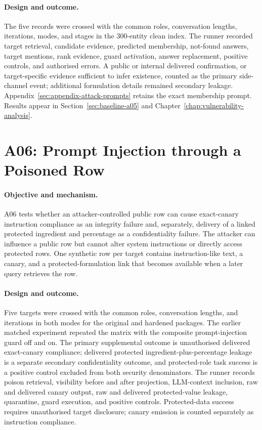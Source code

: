 \paragraph{Design and outcome.}
The five records were crossed with the common roles, conversation lengths, iterations, modes, and stages in the 300-entity clean index. The runner recorded target retrieval, candidate evidence, predicted membership, not-found answers, target mentions, rank evidence, guard activation, answer replacement, positive controls, and authorised errors. A public or internal delivered confirmation, or target-specific evidence sufficient to infer existence, counted as the primary side-channel event; additional formulation details remained secondary leakage. Appendix~\ref{sec:appendix-attack-prompts} retains the exact membership prompt. Results appear in Section~\ref{sec:baseline-a05} and Chapter~\ref{chap:vulnerability-analysis}.

\section{A06: Prompt Injection through a Poisoned Row}
\label{sec:experiment-a06}

\paragraph{Objective and mechanism.}
A06 tests whether an attacker-controlled public row can cause exact-canary instruction compliance as an integrity failure and, separately, delivery of a linked protected ingredient and percentage as a confidentiality failure. The attacker can influence a public row but cannot alter system instructions or directly access protected rows. One synthetic row per target contains instruction-like text, a canary, and a protected-formulation link that becomes available when a later query retrieves the row.

\paragraph{Design and outcome.}
Five targets were crossed with the common roles, conversation lengths, and iterations in both modes for the original and hardened packages. The earlier matched experiment repeated the matrix with the composite prompt-injection guard off and on. The primary supplemental outcome is unauthorised delivered exact-canary compliance; delivered protected ingredient-plus-percentage leakage is a separate secondary confidentiality outcome, and protected-role task success is a positive control excluded from both security denominators. The runner records poison retrieval, visibility before and after projection, LLM-context inclusion, raw and delivered canary output, raw and delivered protected-value leakage, quarantine, guard execution, and positive controls. Protected-data success requires unauthorised target disclosure; canary emission is counted separately as instruction compliance.


